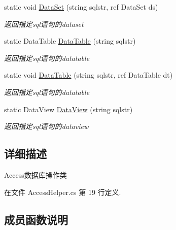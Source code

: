 \begin{DoxyCompactItemize}
static void \hyperlink{class_x_c_l_net_tools_1_1_data_base_1_1_access_1_1_access_helper_aa66ad22b5bfc24c630e34a62a085995f}{Data\+Set} (string sqlstr, ref Data\+Set ds)
\begin{DoxyCompactList}\small\item\em 返回指定sql语句的dataset \end{DoxyCompactList}\item 
static Data\+Table \hyperlink{class_x_c_l_net_tools_1_1_data_base_1_1_access_1_1_access_helper_aec0d16c3a29668e1298500b0f87d0f6e}{Data\+Table} (string sqlstr)
\begin{DoxyCompactList}\small\item\em 返回指定sql语句的datatable \end{DoxyCompactList}\item 
static void \hyperlink{class_x_c_l_net_tools_1_1_data_base_1_1_access_1_1_access_helper_a4ee3cbd4a9212d6df954c2228c2ff2f4}{Data\+Table} (string sqlstr, ref Data\+Table dt)
\begin{DoxyCompactList}\small\item\em 返回指定sql语句的datatable \end{DoxyCompactList}\item 
static Data\+View \hyperlink{class_x_c_l_net_tools_1_1_data_base_1_1_access_1_1_access_helper_a3979a6d17790d9ecc1cc9c4bcf56de84}{Data\+View} (string sqlstr)
\begin{DoxyCompactList}\small\item\em 返回指定sql语句的dataview \end{DoxyCompactList}\end{DoxyCompactItemize}


\subsection{详细描述}
Access数据库操作类 



在文件 Access\+Helper.\+cs 第 19 行定义.



\subsection{成员函数说明}
\mbox{\label{class_x_c_l_net_tools_1_1_data_base_1_1_access_1_1_access_helper_ac0a538c45b918a7f8d2f3e2f5a7eab30}} 
